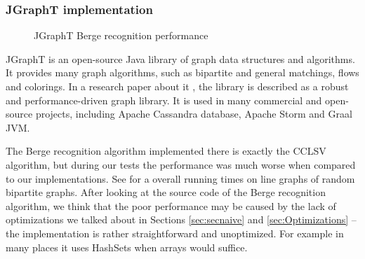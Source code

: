 

\subsubsection{JGraphT implementation}

%   
\begin{figure}
  \centering
  
  \caption{JGraphT Berge recognition performance}
  \label{plot:jgrapht}
\end{figure}

JGraphT \cite{jgrapht} is an open-source Java library of graph data structures and algorithms. It provides many graph algorithms, such as bipartite and general matchings, flows and colorings. In a research paper about it \cite{jgraphtPaper}, the library is described as a robust and performance-driven graph library. It is used in many commercial and open-source projects, including Apache Cassandra database, Apache Storm and Graal JVM.

The Berge recognition algorithm implemented there is exactly the CCLSV algorithm, but during our tests the performance was much worse when compared to our implementations. See  for a overall running times on line graphs of random bipartite graphs. After looking at the source code of the Berge recognition algorithm, we think that the poor performance may be caused by the lack of optimizations we talked about in Sections \ref{sec:secnaive} and \ref{sec:Optimizations} -- the implementation is rather straightforward and unoptimized. For example in many places it uses HashSets when arrays would suffice.

